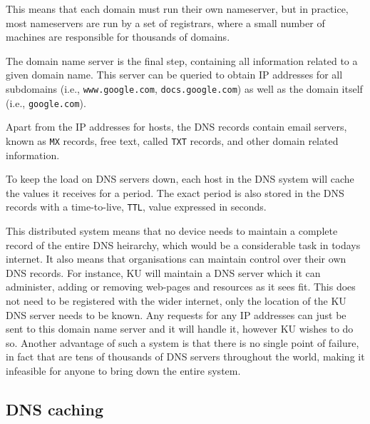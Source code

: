 This means that each domain must run their own nameserver, but in practice, most nameservers are run by a set of registrars, where a small number of machines are responsible for thousands of domains. 

The domain name server is the final step, containing all information related to a given domain name. This server can be queried to obtain IP addresses for all subdomains (i.e., \texttt{www.google.com}, \texttt{docs.google.com}) as well as the domain itself (i.e., \texttt{google.com}).

Apart from the IP addresses for hosts, the DNS records contain email servers, known as \texttt{MX} records, free text, called \texttt{TXT} records, and other domain related information.

To keep the load on DNS servers down, each host in the DNS system will cache the values it receives for a period. The exact period is also stored in the DNS records with a time-to-live, \texttt{TTL}, value expressed in seconds.

This distributed system means that no device needs to maintain a complete record of the entire DNS heirarchy, which would be a considerable task in todays internet. It also means that organisations can maintain control over their own DNS records. For instance, KU will maintain a DNS server which it can administer, adding or removing web-pages and resources as it sees fit. This does not need to be registered with the wider internet, only the location of the KU DNS server needs to be known. Any requests for any IP addresses can just be sent to this domain name server and it will handle it, however KU wishes to do so. Another advantage of such a system is that there is no single point of failure, in fact that are tens of thousands of DNS servers throughout the world, making it infeasible for anyone to bring down the entire system.

\subsection{DNS caching}

